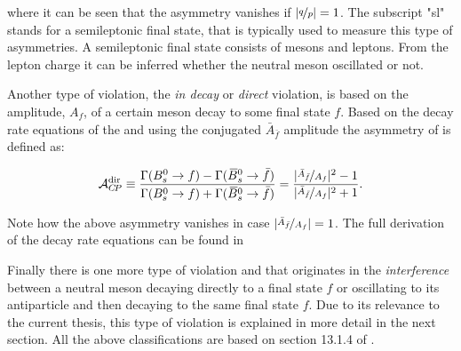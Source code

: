 \noindent where it can be seen that the asymmetry vanishes if $|\nicefrac{q}{p}|= 1$. The subscript "sl" stands for a
semileptonic final state, that is typically used to measure this type of asymmetries. A semileptonic final state
consists of mesons and leptons. From the lepton charge it can be inferred whether the neutral meson oscillated or not.

Another type of \CP violation, the  {\it in decay} or {\it direct} \CP violation, is based on the
amplitude, $A_f$, of a certain meson decay to some final state $f$.
Based on the decay rate equations of the \BBbarSyst and using the \CP conjugated $\bar{A}_{\bar{f}}$
amplitude the asymmetry of  is defined as:

\begin{equation}
  \centering
  \Acp{\text{dir}} \equiv \frac{\Gamma(\Bs \rightarrow f) - \Gamma(\Bsb \rightarrow \bar{f})} {\Gamma(\Bs \rightarrow f) + \Gamma(\Bsb \rightarrow \bar{f})}
                        = \frac{ |\nicefrac{\bar{A}_{\bar{f}}}{A_f}|^2 - 1}{|\nicefrac{\bar{A}_{\bar{f}}}{A_f}|^2 + 1}.
\label{cpv_decay}
\end{equation}

\noindent Note how the above asymmetry vanishes in case $|\nicefrac{\bar{A}_{\bar{f}}}{A_f}| = 1$.
The full derivation of the \BBbarSyst decay rate equations can be found in \cite{PDG,DeBruyn-thesis,jeroenThesis}


Finally there is one more type of \CP violation and that originates in the {\it interference} between
a neutral meson decaying directly to a final state $f$ or oscillating to its antiparticle and then decaying
to the same final state $f$. Due to its relevance to the current thesis, this type of \CP violation is explained
in more detail in the next section. All the above classifications are based on section 13.1.4 of \cite{PDG}.
